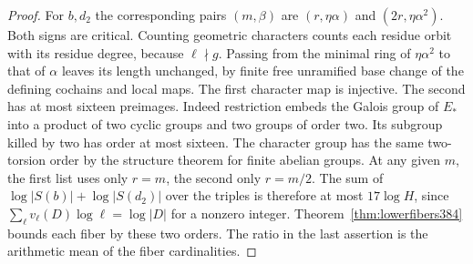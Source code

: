 \documentclass[a4paper,11pt]{article}
\theoremstyle{definition}
\theoremstyle{remark}
\numberwithin{equation}{section}
\begin{document}
\begin{proof}
For \(b,d_2\) the corresponding pairs \((m,\beta)\) are
\((r,\eta\alpha)\) and \((2r,\eta\alpha^2)\). Both signs are
critical. Counting geometric characters counts each residue
orbit with its residue degree, because \(\ell\nmid g\).
Passing from the minimal ring of \(\eta\alpha^2\) to that of
\(\alpha\) leaves its length unchanged, by finite free
unramified base change of the defining cochains and local maps.
The first character map is injective. The second has at most
sixteen preimages. Indeed restriction embeds the Galois group
of \(E_*\) into a product of two cyclic groups and two groups
of order two. Its subgroup killed by two has order at most
sixteen. The character group has the same two-torsion order by
the structure theorem for finite abelian groups. At any given
\(m\), the first list uses only \(r=m\), the second only
\(r=m/2\). The sum of \(\log|S(b)|+\log|S(d_2)|\) over the
triples is therefore at most \(17\log H\), since
\(\sum_\ell v_\ell(D)\log\ell=\log|D|\) for a nonzero integer.
Theorem~\ref{thm:lowerfibers384} bounds each fiber by these two
orders. The ratio in the last assertion is the arithmetic
mean of the fiber cardinalities.
\end{proof}
\end{document}
